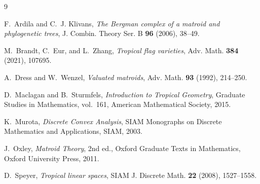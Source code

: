 \documentclass[11pt]{article}
\theoremstyle{plain}
\theoremstyle{definition}
\begin{document}
\begin{thebibliography}{9}

F.~Ardila and C.~J. Klivans,
\emph{The Bergman complex of a matroid and phylogenetic trees},
J. Combin. Theory Ser. B \textbf{96} (2006), 38--49.

M.~Brandt, C.~Eur, and L.~Zhang,
\emph{Tropical flag varieties},
Adv. Math. \textbf{384} (2021), 107695.

A.~Dress and W.~Wenzel,
\emph{Valuated matroids},
Adv. Math. \textbf{93} (1992), 214--250.

D.~Maclagan and B.~Sturmfels,
\emph{Introduction to Tropical Geometry},
Graduate Studies in Mathematics, vol.~161,
American Mathematical Society, 2015.

K.~Murota,
\emph{Discrete Convex Analysis},
SIAM Monographs on Discrete Mathematics and Applications,
SIAM, 2003.

J.~Oxley,
\emph{Matroid Theory},
2nd ed.,
Oxford Graduate Texts in Mathematics,
Oxford University Press, 2011.

D.~Speyer,
\emph{Tropical linear spaces},
SIAM J. Discrete Math. \textbf{22} (2008), 1527--1558.

\end{thebibliography}
\end{document}
